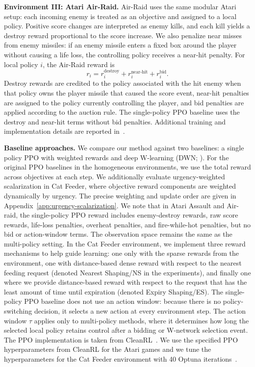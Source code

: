 \textbf{Environment III: Atari Air-Raid.} Air-Raid uses the same modular Atari setup: each incoming enemy is treated as an objective and assigned to a local policy.
Positive score changes are interpreted as enemy kills, and each kill yields a destroy reward proportional to the score increase.
We also penalize near misses from enemy missiles: if an enemy missile enters a fixed box around the player without causing a life loss, the controlling policy receives a near-hit penalty.
For local policy $i$, the Air-Raid reward is
\[
    r_i =
    r_i^{\mathrm{destroy}}
    + r_i^{\mathrm{near\text{-}hit}}
    + r_i^{\mathrm{bid}} .
\]
Destroy rewards are credited to the policy associated with the hit enemy when that policy owns the player missile that caused the score event, near-hit penalties are assigned to the policy currently controlling the player, and bid penalties are applied according to the auction rule.
The single-policy PPO baseline uses the destroy and near-hit terms without bid penalties.
Additional training and implementation details are reported in~.


\textbf{Baseline approaches.}
We compare our method against two baselines: a single policy PPO with weighted rewards and deep W-learning (DWN; \citep{rosero2024multi}). 
For the original PPO baselines in the homogeneous environments, we use the total reward across objectives at each step.
We additionally evaluate urgency-weighted scalarization in Cat Feeder, where objective reward components are weighted dynamically by urgency.
The precise weighting and update order are given in Appendix~\ref{app:urgency-scalarization}.
We note that in Atari Assault and Air-raid, the single-policy PPO reward includes enemy-destroy rewards, raw score rewards, life-loss penalties, overheat penalties, and fire-while-hot penalties, but no bid or action-window terms.
The observation space remains the same as the multi-policy setting. 
In the Cat Feeder environment, we implement three reward mechanisms to help guide learning: one only with the sparse rewards from the environment, one with distance-based dense reward with respect to the nearest feeding request (denoted Nearest Shaping/NS in the experiments), and finally one where we provide distance-based reward with respect to the request that has the least amount of time until expiration (denoted Expiry Shaping/ES).
The single-policy PPO baseline does not use an action window: because there is no policy-switching decision, it selects a new action at every environment step. The action window \(\tau\) applies only to multi-policy methods, where it determines how long the selected local policy retains control after a bidding or W-network selection event.
The PPO implementation is taken from CleanRL~\citep{huang2022cleanrl}.
We use the specified PPO hyperparameters from CleanRL for the Atari games and we tune the hyperparameters for the Cat Feeder environment with 40 Optuna iterations~\citep{akiba2019optuna}.

